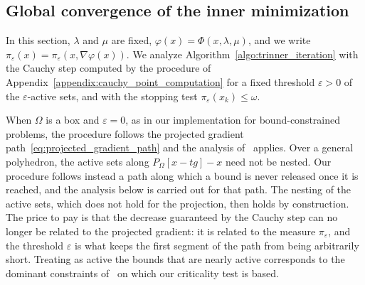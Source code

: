 \documentclass[pdflatex,sn-mathphys-num]{sn-jnl}%
\theoremstyle{thmstyleone}%
\newcommand{\proj}[2]{P_{#1} \left[ {#2} \right]} %
\begin{document}
\subsection{Global convergence of the inner minimization}\label{subsec:inner_convergence}

In this section, $\lambda$ and $\mu$ are fixed, $\varphi(x) = \Phi(x,\lambda,\mu)$, and we write $\pi_\varepsilon(x) = \pi_\varepsilon(x,\nabla\varphi(x))$. We analyze Algorithm~\ref{algo:trinner_iteration} with the Cauchy step computed by the procedure of Appendix~\ref{appendix:cauchy_point_computation} for a fixed threshold $\varepsilon > 0$ of the $\varepsilon$-active sets, and with the stopping test $\pi_\varepsilon(x_k) \le \omega$.

When $\Omega$ is a box and $\varepsilon = 0$, as in our implementation for bound-constrained problems, the procedure follows the projected gradient path~\eqref{eq:projected_gradient_path} and the analysis of~\cite{conn-etal:1988a} applies. Over a general polyhedron, the active sets along $\proj{\Omega}{x-tg}-x$ need not be nested. Our procedure follows instead a path along which a bound is never released once it is reached, and the analysis below is carried out for that path. The nesting of the active sets, which does not hold for the projection, then holds by construction. The price to pay is that the decrease guaranteed by the Cauchy step can no longer be related to the projected gradient: it is related to the measure $\pi_\varepsilon$, and the threshold $\varepsilon$ is what keeps the first segment of the path from being arbitrarily short. Treating as active the bounds that are nearly active corresponds to the dominant constraints of~\cite{conn-etal:1996b} on which our criticality test is based.
\end{document}
